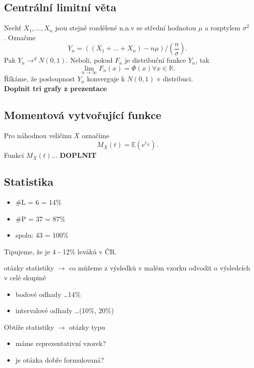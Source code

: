 \documentclass[../main.tex]{subfiles}
\begin{document}
\subsection{Centrální limitní věta}
\begin{theorem}
    Nechť $X_1,\dots,X_n$ jsou stejně rozdělené n.n.v se střední hodnotou $\mu$ a rozptylem $\sigma^2$. Označme
    \[Y_n = ((X_1 + \dots + X_n) - n\mu)/(\frac{n}\sigma).\]
    Pak $Y_n \rightarrow^d N(0,1)$. Neboli, pokud $F_n$ je distribuční funkce $Y_n$, tak
    \[\lim_{n \rightarrow \infty}F_n(x) = \Phi(x) \forall x\in \mathbb{R}.\]
    Říkáme, že posloupnost $Y_n$ konverguje k $N(0,1)$ v distribuci.
    \\ \textbf{Doplnit tri grafy z prezentace}
\end{theorem}

\subsection{Momentová vytvořující funkce}
\begin{definition}
    Pro náhodnou veličinu $X$ označíme
    \[M_X(t) = \mathbb{E}(e^{t_{X}}).\]
    Funkci $M_X(t)\dots$
    \textbf{DOPLNIT}
\end{definition}

\subsection{Statistika}
\begin{example}

    \begin{itemize}
        \item \#L = 6 = 14\%
        \item \#P = 37 = 87\%
        \item spolu: 43 = 100\%
    \end{itemize}
    Tipujeme, že je 4 - 12\% leváků v ČR.

    \begin{remark}

        otázky statistiky $\rightarrow$ co můžeme z výsledků v malém vzorku odvodit o výsledcích v celé skupině
        \begin{itemize}
        \item bodové odhady \dots 14\%
        \item intervalové odhady \dots (10\%, 20\%)
        \end{itemize}
        Obtíže statistiky $\rightarrow$ otázky typu
        \begin{itemize}
            \item máme reprezentativní vzorek?
            \item je otázka dobře formulovaná?
        \end{itemize}
    \end{remark}
\end{example}
\end{document}
